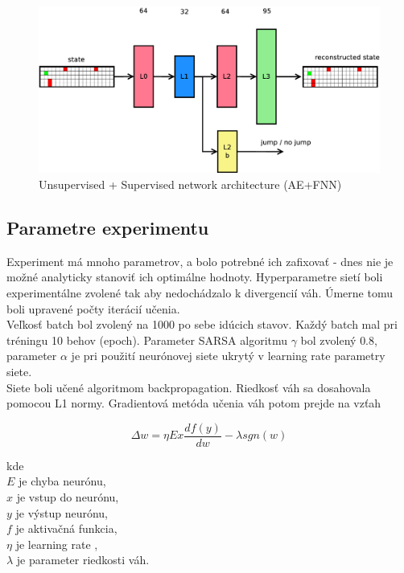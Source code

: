 \documentclass[10pt,a4paper]{article}
\begin{document}
\begin{figure}[!h]
  \centering
  \includegraphics[scale=0.4]{../../diagrams/hnn.png}
  \caption{Unsupervised + Supervised network architecture (AE+FNN)}
  \label{img:Unsupervised + Supervised network architecture}
\end{figure}

\subsection{Parametre experimentu}

Experiment má mnoho parametrov, a bolo potrebné ich zafixovať - dnes nie
je možné analyticky stanoviť ich optimálne hodnoty.
Hyperparametre sietí boli experimentálne zvolené tak aby nedochádzalo k
divergencií váh. Úmerne tomu boli upravené počty iterácií učenia.
\\
Veľkosť batch bol zvolený na 1000 po sebe idúcich stavov. Každý batch mal pri tréningu
10 behov (epoch). Parameter SARSA algoritmu $\gamma$ bol zvolený $0.8$,
parameter $\alpha$ je pri použití neurónovej siete ukrytý v learning rate parametry siete.
\\
Siete boli učené algoritmom backpropagation. Riedkosť váh sa dosahovala pomocou L1 normy.
Gradientová metóda učenia váh potom prejde na vzťah

\begin{equation}
  \label{eq:weights_training}
  \Delta w = \eta E x \frac{df(y)}{dw} - \lambda sgn(w)
\end{equation}

kde \\
$E$ je chyba neurónu, \\
$x$ je vstup do neurónu, \\
$y$ je výstup neurónu, \\
$f$ je aktivačná funkcia, \\
$\eta$ je learning rate , \\
$\lambda$ je parameter riedkosti váh.
\end{document}
